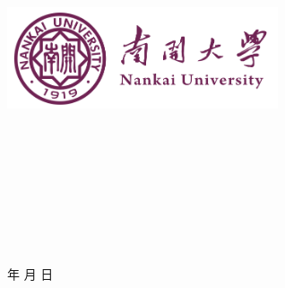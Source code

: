 \documentclass[12pt,a4paper]{article}
\begin{document}
\renewcommand{\contentsname}{目录}
\renewcommand{\appendixname}{附录}
\renewcommand{\appendixpagename}{附录}
\renewcommand{\refname}{参考文献} 
\renewcommand{\figurename}{图}
\renewcommand{\tablename}{表}
\renewcommand{\abstractname}{摘要}
\renewcommand{\today}{\number\year 年 \number\month 月 \number\day 日}

\renewcommand {\thefigure}{\thesection{}.\arabic{figure}}%
\renewcommand{\figurename}{图}
\renewcommand{\contentsname}{目录}  

\begin{titlepage}
    \begin{center}
    \includegraphics[width=0.6\textwidth]{NKU.png}\\[1cm]
    \vspace{20mm}
		\textbf{\huge\textbf{}}\\[0.5cm]
		\textbf{\huge{}}\\[2.3cm]

		\vspace{\fill}
    
    \centering
    \textsc{\LARGE {}}\\[0.5cm]
    \textsc{\LARGE {}}\\[0.5cm]
    \textsc{\LARGE {}}\\[0.5cm]
    \textsc{\LARGE {}}\\[0.5cm]
    \textsc{\LARGE {}}\\[0.5cm]
    \textsc{\LARGE {}}\\[0.5cm]
    \vfill
    {\Large \today}
    \end{center}
\end{titlepage}
\end{document}
